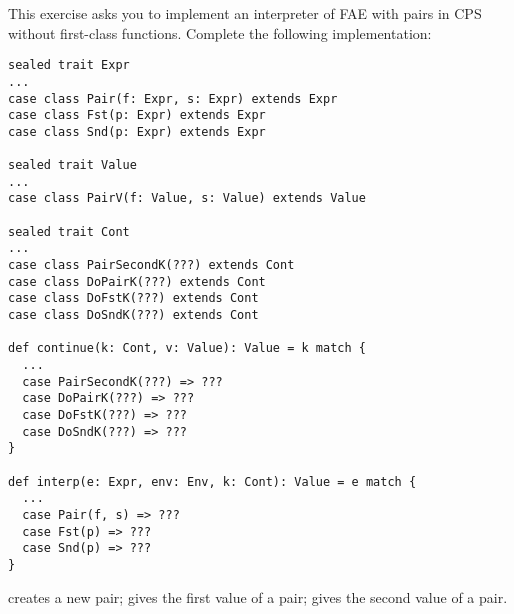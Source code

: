 \begin{exercise}

This exercise asks you to implement an interpreter of \textsf{FAE}
with pairs in CPS without first-class functions.
Complete the following implementation:

\begin{verbatim}
sealed trait Expr
...
case class Pair(f: Expr, s: Expr) extends Expr
case class Fst(p: Expr) extends Expr
case class Snd(p: Expr) extends Expr

sealed trait Value
...
case class PairV(f: Value, s: Value) extends Value

sealed trait Cont
...
case class PairSecondK(???) extends Cont
case class DoPairK(???) extends Cont
case class DoFstK(???) extends Cont
case class DoSndK(???) extends Cont

def continue(k: Cont, v: Value): Value = k match {
  ...
  case PairSecondK(???) => ???
  case DoPairK(???) => ???
  case DoFstK(???) => ???
  case DoSndK(???) => ???
}

def interp(e: Expr, env: Env, k: Cont): Value = e match {
  ...
  case Pair(f, s) => ???
  case Fst(p) => ???
  case Snd(p) => ???
}
\end{verbatim}

 creates a new pair;  gives the first value of a
pair;  gives the second value of a pair.

\end{exercise}

